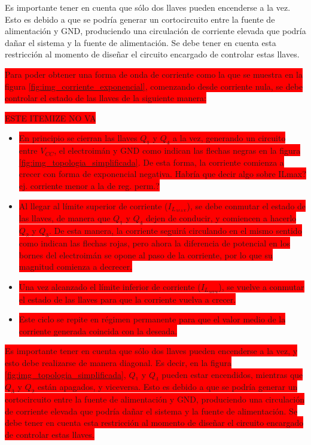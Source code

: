 Es importante tener en cuenta que sólo dos llaves pueden encenderse a la vez. Esto es debido a que se podría generar un cortocircuito entre la fuente de alimentación y GND, produciendo una circulación de corriente elevada que podría dañar el sistema y la fuente de alimentación. Se debe tener en cuenta esta restricción al momento de diseñar el circuito encargado de controlar estas llaves.

\colorbox{red}{Para poder obtener una forma de onda de corriente como la que se muestra en la figura \ref{fig:img_corriente_exponencial}, comenzando desde corriente nula, se debe controlar el estado de las llaves de la siguiente manera:}

\colorbox{red}{ESTE ITEMIZE NO VA}
\begin{itemize}
	\item \colorbox{red}{En principio se cierran las llaves $Q_1$ y $Q_4$ a la vez, generando un circuito entre $V_{CC}$, el electroimán y GND como indican las flechas negras en la figura \ref{fig:img_topologia_simplificada}. De esta forma, la corriente comienza a crecer con forma de exponencial negativa. }
	\colorbox{red}{Habría que decir algo sobre ILmax? ej. corriente menor a la de reg. perm.?}
	\item \colorbox{red}{Al llegar al límite superior de corriente ($I_{L_{MAX}}$), se debe conmutar el estado de las llaves, de manera que $Q_1$ y $Q_4$ dejen de conducir, y comiencen a hacerlo $Q_2$ y $Q_3$. De esta manera, la corriente seguirá circulando en el mismo sentido como indican las flechas rojas, pero ahora la diferencia de potencial en los bornes del electroimán se opone al paso de la corriente, por lo que su magnitud comienza a decrecer.}
	\item \colorbox{red}{Una vez alcanzado el límite inferior de corriente ($I_{L_{MIN}}$), se vuelve a conmutar el estado de las llaves para que la corriente vuelva a crecer.}
	\item \colorbox{red}{Este ciclo se repite en régimen permanente para que el valor medio de la corriente generada coincida con la deseada. }
\end{itemize}
\colorbox{red}{
Es importante tener en cuenta que sólo dos llaves pueden encenderse a la vez, y esto debe realizarse de manera diagonal. Es decir, en la figura \ref{fig:img_topologia_simplificada}, $Q_1$ y $Q_4$ pueden estar encendidos, mientras que $Q_3$ y $Q_2$ están apagados, y viceversa. Esto es debido a que se podría generar un cortocircuito entre la fuente de alimentación y GND, produciendo una circulación de corriente elevada que podría dañar el sistema y la fuente de alimentación. Se debe tener en cuenta esta restricción al momento de diseñar el circuito encargado de controlar estas llaves.
}

